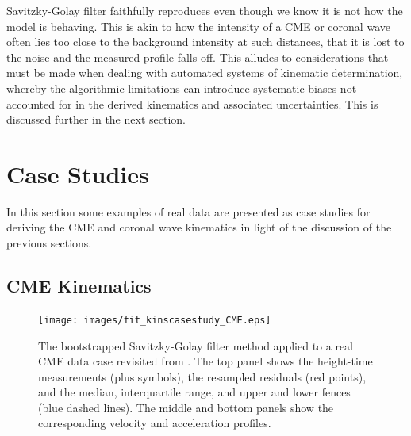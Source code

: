 \documentclass[structabstract]{aa}
\begin{document}
Savitzky-Golay filter faithfully reproduces even though we know it is not how the model is behaving. This is akin to how the intensity of a CME or coronal wave often lies too close to the background intensity at such distances, that it is lost to the noise and the measured profile falls off. This alludes to considerations that must be made when dealing with automated systems of kinematic determination, whereby the algorithmic limitations can introduce systematic biases not accounted for in the derived kinematics and associated uncertainties. This is discussed further in the next section.




\section{Case Studies}
\label{sect:case_studies}

In this section some examples of real data are presented as case studies for deriving the CME and coronal wave kinematics in light of the discussion of the previous sections. %

\subsection{CME Kinematics}
\label{subsect:corimp}


\begin{figure}
\centering
\texttt{[image: images/fit\_kinscasestudy\_CME.eps]}
\caption{The bootstrapped Savitzky-Golay filter method applied to a real CME data case revisited from \citealt{2009A&A...495..325B}. The top panel shows the height-time measurements (plus symbols), the resampled residuals (red points), and the median, interquartile range, and upper and lower fences (blue dashed lines). The middle and bottom panels show the corresponding velocity and acceleration profiles.}
\label{fig_savgol_CME}
\end{figure}
\end{document}
